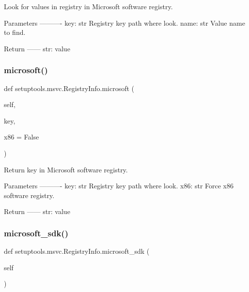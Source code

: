 \begin{DoxyVerb}Look for values in registry in Microsoft software registry.

Parameters
----------
key: str
    Registry key path where look.
name: str
    Value name to find.

Return
------
str: value
\end{DoxyVerb}
 \mbox{\label{classsetuptools_1_1msvc_1_1_registry_info_ac7992b4e588edd0aebb0a33fa266ebc8}} 
\subsubsection{\texorpdfstring{microsoft()}{microsoft()}}
{\footnotesize\ttfamily def setuptools.\+msvc.\+Registry\+Info.\+microsoft (\begin{DoxyParamCaption}\item[{}]{self,  }\item[{}]{key,  }\item[{}]{x86 = {\ttfamily False} }\end{DoxyParamCaption})}

\begin{DoxyVerb}Return key in Microsoft software registry.

Parameters
----------
key: str
    Registry key path where look.
x86: str
    Force x86 software registry.

Return
------
str: value
\end{DoxyVerb}
 \mbox{\label{classsetuptools_1_1msvc_1_1_registry_info_a5ad942fb235475bd805634ca70652f38}} 
\subsubsection{\texorpdfstring{microsoft\+\_\+sdk()}{microsoft\_sdk()}}
{\footnotesize\ttfamily def setuptools.\+msvc.\+Registry\+Info.\+microsoft\+\_\+sdk (\begin{DoxyParamCaption}\item[{}]{self }\end{DoxyParamCaption})}

